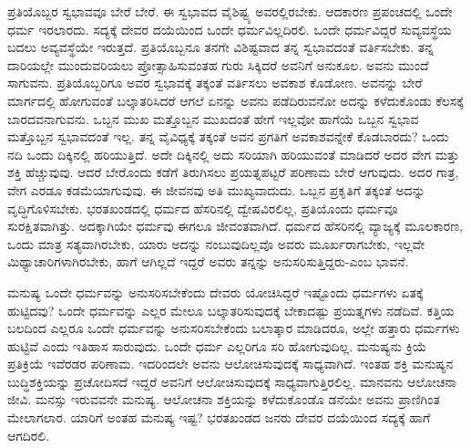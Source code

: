 ಪ್ರತಿಯೊಬ್ಬರ ಸ್ವಭಾವವೂ ಬೇರೆ ಬೇರೆ. ಈ ಸ್ವಭಾವದ ವೈಶಿಷ್ಟ್ಯ ಅವರಲ್ಲಿರಬೇಕು. ಆದಕಾರಣ ಪ್ರಪಂಚದಲ್ಲಿ ಒಂದೇ ಧರ್ಮ ಇರಲಾರದು. ಸದ್ಯಕ್ಕೆ ದೇವರ ದಯೆಯಿಂದ ಒಂದೇ ಧರ್ಮವಿಲ್ಲದಿರಲಿ. ಒಂದೇ ಧರ್ಮವಿದ್ದರೆ ಸುವ್ಯವಸ್ಥೆಯ ಬದಲು ಅವ್ಯವಸ್ಥೆಯೇ ಇರುತ್ತದೆ. ಪ್ರತಿಯೊಬ್ಬನೂ ತನಗೇ ವಿಶಿಷ್ಟವಾದ ತನ್ನ ಸ್ವಭಾವದಂತೆ ವರ್ತಿಸಬೇಕು. ತನ್ನ ದಾರಿಯಲ್ಲೇ ಮುಂದುವರಿಯಲು ಪ್ರೋತ್ಸಾಹಿಸುವಂತಹ ಗುರು ಸಿಕ್ಕಿದರೆ ಅವನಿಗೆ ಅನುಕೂಲ. ಅವನು ಮುಂದೆ ಸಾಗುವನು. ಪ್ರತಿಯೊಬ್ಬರಿಗೂ ಅವರ ಸ್ವಭಾವಕ್ಕೆ ತಕ್ಕಂತೆ ವರ್ತಿಸಲು ಅವಕಾಶ ಕೊಡೋಣ. ಅವನನ್ನು ಬೇರೆ ಮಾರ್ಗದಲ್ಲಿ ಹೋಗುವಂತೆ ಬಲ್ಕಾತರಿಸಿದರೆ ಆಗಲೆ ಏನನ್ನು ಅವನು ಪಡೆದಿರುವನೋ ಅದನ್ನು ಕಳೆದುಕೊಂಡು ಕೆಲಸಕ್ಕೆ ಬಾರದವನಾಗುವನು. ಒಬ್ಬನ ಮುಖ ಮತ್ತೊಬ್ಬನ ಮುಖದಂತೆ ಹೇಗೆ ಇಲ್ಲವೋ ಹಾಗೆಯೆ ಒಬ್ಬನ ಸ್ವಭಾವ ಮತ್ತೊಬ್ಬನ ಸ್ವಭಾವದಂತೆ ಇಲ್ಲ. ತನ್ನ ವೈವಿಧ್ಯಕ್ಕೆ ತಕ್ಕಂತೆ ಅವನ ಪ್ರಗತಿಗೆ ಅವಕಾಶವನ್ನೇಕೆ ಕೊಡಬಾರದು? ಒಂದು ನದಿ ಒಂದು ದಿಕ್ಕಿನಲ್ಲಿ ಹರಿಯುತ್ತಿದೆ. ಅದೇ ದಿಕ್ಕಿನಲ್ಲಿ ಅದು ಸರಿಯಾಗಿ ಹರಿಯುವಂತೆ ಮಾಡಿದರೆ ಅದರ ವೇಗ ಮತ್ತು ಶಕ್ತಿ ಹೆಚ್ಚುವುವು. ಆದರೆ ಬೇರೊಂದು ಕಡೆಗೆ ತಿರುಗಿಸಲು ಪ್ರಯತ್ನಪಟ್ಟರೆ ಪರಿಣಾಮ ಬೇರೆ ಆಗುವುದು. ಅದರ ಗಾತ್ರ, ವೇಗ ಎರಡೂ ಕಡಮೆಯಾಗುವುವು. ಈ ಜೀವನವು ಅತಿ ಮುಖ್ಯವಾದುದು. ಒಬ್ಬನ ಪ್ರಕೃತಿಗೆ ತಕ್ಕಂತೆ ಅದನ್ನು ವೃದ್ಧಿಗೊಳಿಸಬೇಕು. ಭರತಖಂಡದಲ್ಲಿ ಧರ್ಮದ ಹೆಸರಿನಲ್ಲಿ ದ್ವೇಷವಿರಲಿಲ್ಲ, ಪ್ರತಿಯೊಂದು ಧರ್ಮವೂ ಸುರಕ್ಷಿತವಾಗಿತ್ತು. ಅದಕ್ಕಾಗಿಯೇ ಧರ್ಮವು ಈಗಲೂ ಜೀವಂತವಾಗಿದೆ. ಧರ್ಮದ ಹೆಸರಿನಲ್ಲಿ ವ್ಯಾಜ್ಯಕ್ಕೆ ಮೂಲಕಾರಣ, ಒಂದು ಮಾತ್ರ ಸತ್ಯವಾಗಿರಬೇಕು, ಯಾರು ಅದನ್ನು ನಂಬುವುದಿಲ್ಲವೊ ಅವರು ಮೂರ್ಖರಾಗಬೇಕು, ಇಲ್ಲವೇ ಮಿಥ್ಯಾಚಾರಿಗಳಾಗಿರಬೇಕು, ಹಾಗೆ ಆಗಿಲ್ಲದೆ ಇದ್ದರೆ ಅವರು ತನ್ನನ್ನು ಅನುಸರಿಸುತ್ತಿದ್ದರು-ಎಂಬ ಭಾವನೆ.

ಮನುಷ್ಯ ಒಂದೇ ಧರ್ಮವನ್ನು ಅನುಸರಿಸಬೇಕೆಂದು ದೇವರು ಯೋಚಿಸಿದ್ದರೆ ಇಷ್ಟೊಂದು ಧರ್ಮಗಳು ಏತಕ್ಕೆ ಹುಟ್ಟಿದವು? ಒಂದೇ ಧರ್ಮವನ್ನು ಎಲ್ಲರ ಮೇಲೂ ಬಲ್ಕಾತರಿಸುವುದಕ್ಕೆ ಬೇಕಾದಷ್ಟು ಪ್ರಯತ್ನಗಳು ನಡೆದಿವೆ. ಕತ್ತಿಯ ಬಲದಿಂದ ಎಲ್ಲರೂ ಒಂದೇ ಧರ್ಮವನ್ನು ಅನುಸರಿಸಬೇಕೆಂದು ಬಲಾತ್ಕಾರ ಮಾಡಿದರೂ, ಅಲ್ಲೇ ಹತ್ತಾರು ಧರ್ಮಗಳು ಹುಟ್ಟಿವೆ ಎಂದು ಇತಿಹಾಸ ಸಾರುವುದು. ಒಂದೇ ಧರ್ಮ ಎಲ್ಲರಿಗೂ ಸರಿ ಹೋಗುವುದಿಲ್ಲ. ಮನುಷ್ಯನು ಕ್ರಿಯೆ ಪ್ರತಿಕ್ರಿಯೆ ಇವೆರಡರ ಪರಿಣಾಮ. ಇದರಿಂದಲೇ ಅವನು ಆಲೋಚಿಸುವುದಕ್ಕೆ ಸಾಧ್ಯವಾಗಿದೆ. ಇಂತಹ ಶಕ್ತಿ ಮನುಷ್ಯನ ಬುದ್ಧಿಶಕ್ತಿಯನ್ನು ಪ್ರಚೋದಿಸದೆ ಇದ್ದರೆ ಅವನಿಗೆ ಆಲೋಚಿಸುವುದಕ್ಕೆ ಸಾಧ್ಯವಾಗುತ್ತಿರಲಿಲ್ಲ. ಮಾನವನು ಆಲೋಚನಾ ಜೀವಿ. ಮನಸ್ಸು ಇರುವವನೇ ಮನುಷ್ಯ. ಆಲೋಚನಾ ಶಕ್ತಿಯನ್ನು ಕಳೆದುಕೊಂಡೊ ಡನೆಯೇ ಅವನು ಪ್ರಾಣಿಗಿಂತ ಮೇಲಾಗಲಾರ. ಯಾರಿಗೆ ಅಂತಹ ಮನುಷ್ಯ ಇಷ್ಟ? ಭರತಖಂಡದ ಜನರು ದೇವರ ದಯೆಯಿಂದ ಸದ್ಯಕ್ಕೆ ಹಾಗೆ ಆಗದಿರಲಿ.

